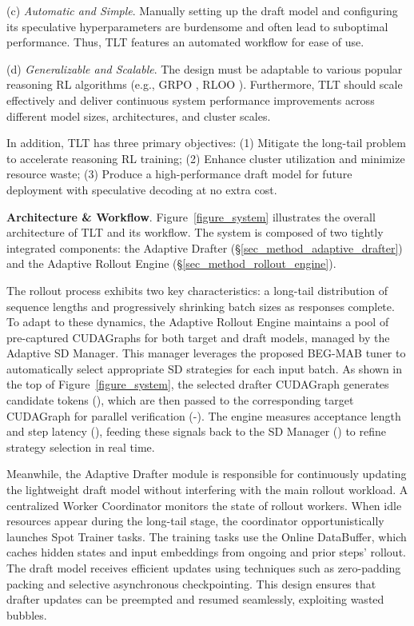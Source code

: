 \documentclass[sigplan,screen]{acmart}
\newcommand{\oney}{\raisebox{-0.35mm}{\Large{\ding{172}}}}
\newcommand{\twoy}{\raisebox{-0.35mm}{\Large{\ding{173}}}}
\newcommand{\threey}{\raisebox{-0.35mm}{\Large{\ding{174}}}}
\newcommand{\foury}{\raisebox{-0.35mm}{\Large{\ding{175}}}}
\newcommand{\fivey}{\raisebox{-0.35mm}{\Large{\ding{176}}}}
\newcommand{\SysName}{\textrm{TLT}\xspace}
\begin{document}
\noindent(c) \emph{Automatic and Simple}. Manually setting up the draft model and configuring its speculative hyperparameters are burdensome and often lead to suboptimal performance. Thus, \SysName features an automated workflow for ease of use.

\noindent(d) \emph{Generalizable and Scalable}. The design must be adaptable to various popular reasoning RL algorithms (e.g., GRPO \cite{DeepSeekMath}, RLOO \cite{RLOO}). Furthermore, \SysName should scale effectively and deliver continuous system performance improvements across different model sizes, architectures, and cluster scales.

In addition, \SysName has three primary objectives: (1) Mitigate the long-tail problem to accelerate reasoning RL training; (2) Enhance cluster utilization and minimize resource waste; (3) Produce a high-performance draft model for future deployment with speculative decoding at no extra cost.


\noindent\textbf{Architecture \& Workflow}.
Figure~\ref{figure_system}  illustrates the overall architecture of \SysName and its workflow. The system is composed of two tightly integrated components: the Adaptive Drafter (\S \ref{sec_method_adaptive_drafter}) and the Adaptive Rollout Engine (\S \ref{sec_method_rollout_engine}).

The rollout process exhibits two key characteristics: a long-tail distribution of sequence lengths and progressively shrinking batch sizes as responses complete. To adapt to these dynamics, the Adaptive Rollout Engine maintains a pool of pre-captured CUDAGraphs for both target and draft models, managed by the Adaptive SD Manager. This manager leverages the proposed BEG-MAB tuner to automatically select appropriate SD strategies for each input batch. As shown in the top of Figure~\ref{figure_system}, the selected drafter CUDAGraph generates candidate tokens (\oney), which are then passed to the corresponding target CUDAGraph for parallel verification (\twoy-\threey). The engine measures acceptance length and step latency (\foury), feeding these signals back to the SD Manager (\fivey) to refine strategy selection in real time.

Meanwhile, the Adaptive Drafter module is responsible for continuously updating the lightweight draft model without interfering with the main rollout workload. A centralized Worker Coordinator monitors the state of rollout workers. When idle resources appear during the long-tail stage, the coordinator opportunistically launches Spot Trainer tasks. The training tasks use the Online DataBuffer, which caches hidden states and input embeddings from ongoing and prior steps' rollout. The draft model receives efficient updates using techniques such as zero-padding packing and selective asynchronous checkpointing. This design ensures that drafter updates can be preempted and resumed seamlessly, exploiting wasted bubbles.
\end{document}
